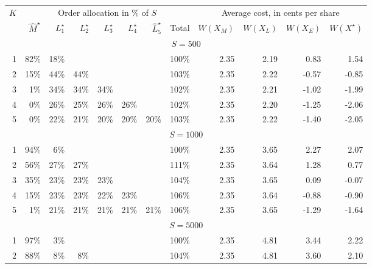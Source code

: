 \documentclass[opre,nonblindrev]{informs3}
\begin{document}
\newpage
\begin{table}[!h]
\begin{center}
\small
\begin{tabular}{|r|r r r r r r r|r r r r|}
\hline
\multirow{2}{*}{$K$} & \multicolumn{7}{|c|}{Order allocation in \% of $S$} & \multicolumn{4}{|c|}{Average cost, in cents per share}\\
\cline{2-12}
 & $\hat M^\star$ & $L^\star_1$ & $L^\star_2$ & $L^\star_3$ & $L^\star_4$ &  $\hat L^\star_5$ & Total & $W(X_M)$ & $W(X_L)$ & $W(X_E)$ & $W(X^\star)$\\
\hline
\multicolumn{12}{|c|}{$S=500$}\\
\hline
1 & 82\% & 18\% &  &  &  &  & 100\% & 2.35 & 2.19 & 0.83 & 1.54\\

2 & 15\% & 44\% & 44\% &  &  &  & 103\% & 2.35 & 2.22 & -0.57 & -0.85\\

3 & 1\% & 34\% & 34\% & 34\% &  &  & 102\% & 2.35 & 2.21 & -1.02 & -1.99\\

4 & 0\% & 26\% & 25\% & 26\% & 26\% &  & 102\% & 2.35 & 2.20 & -1.25 & -2.06\\

5 & 0\% & 22\% & 21\% & 20\% & 20\% & 20\% & 103\% & 2.35 & 2.22 & -1.40 & -2.05\\
\hline
\multicolumn{12}{|c|}{$S=1000$}\\
\hline
1 & 94\% & 6\% &  &  &  &  & 100\% & 2.35 & 3.65 & 2.27 & 2.07\\

2 & 56\% & 27\% & 27\% &  &  &  & 111\% & 2.35 & 3.64 & 1.28 & 0.77\\

3 & 35\% & 23\% & 23\% & 23\% &  &  & 104\% & 2.35 & 3.65 & 0.09 & -0.07\\

4 & 15\% & 23\% & 23\% & 22\% & 23\% &  & 106\% & 2.35 & 3.64 & -0.88 & -0.90\\

5 & 1\% & 21\% & 21\% & 21\% & 21\% & 21\% & 106\% & 2.35 & 3.65 & -1.29 & -1.64\\
\hline
\multicolumn{12}{|c|}{$S=5000$}\\
\hline
1 & 97\% & 3\% &  &  &  &  & 100\% & 2.35 & 4.81 & 3.44 & 2.22\\

2 & 88\% & 8\% & 8\% &  &  &  & 104\% & 2.35 & 4.81 & 3.60 & 2.10\\


\end{tabular}
\end{center}
\end{table}
\end{document}

